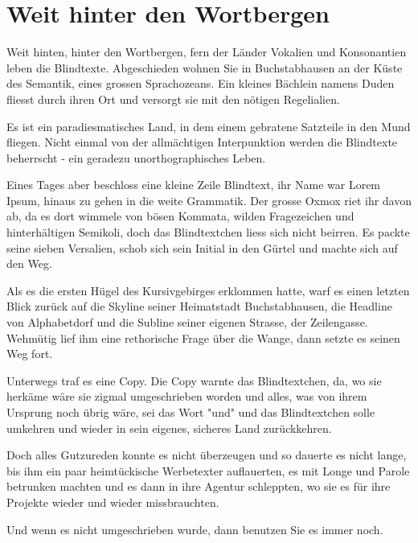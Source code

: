 \chapter{Weit hinter den Wortbergen}
\label{cha:wortberge}





Weit hinten, hinter den Wortbergen, fern der Länder Vokalien und Konsonantien leben die Blindtexte. Abgeschieden wohnen Sie in Buchstabhausen an der Küste des Semantik, eines grossen Sprachozeans. Ein kleines Bächlein namens Duden fliesst durch ihren Ort und versorgt sie mit den nötigen Regelialien.

Es ist ein paradiesmatisches Land, in dem einem gebratene Satzteile in den Mund fliegen. Nicht einmal von der allmächtigen Interpunktion werden die Blindtexte beherrscht - ein geradezu unorthographisches Leben.

Eines Tages aber beschloss eine kleine Zeile Blindtext, ihr Name war Lorem Ipsum, hinaus zu gehen in die weite Grammatik. Der grosse Oxmox riet ihr davon ab, da es dort wimmele von bösen Kommata, wilden Fragezeichen und hinterhältigen Semikoli, doch das Blindtextchen liess sich nicht beirren. Es packte seine sieben Versalien, schob sich sein Initial in den Gürtel und machte sich auf den Weg.

Als es die ersten Hügel des Kursivgebirges erklommen hatte, warf es einen letzten Blick zurück auf die Skyline seiner Heimatstadt Buchstabhausen, die Headline von Alphabetdorf und die Subline seiner eigenen Strasse, der Zeilengasse. Wehmütig lief ihm eine rethorische Frage über die Wange, dann setzte es seinen Weg fort.

Unterwegs traf es eine Copy. Die Copy warnte das Blindtextchen, da, wo sie herkäme wäre sie zigmal umgeschrieben worden und alles, was von ihrem Ursprung noch übrig wäre, sei das Wort "und" und das Blindtextchen solle umkehren und wieder in sein eigenes, sicheres Land zurückkehren.

Doch alles Gutzureden konnte es nicht überzeugen und so dauerte es nicht lange, bis ihm ein paar heimtückische Werbetexter auflauerten, 
es mit Longe und Parole betrunken machten und es dann in ihre Agentur schleppten, wo sie es für ihre Projekte wieder und wieder missbrauchten.

Und wenn es nicht umgeschrieben wurde, dann benutzen Sie es immer noch.

\textbf{}

